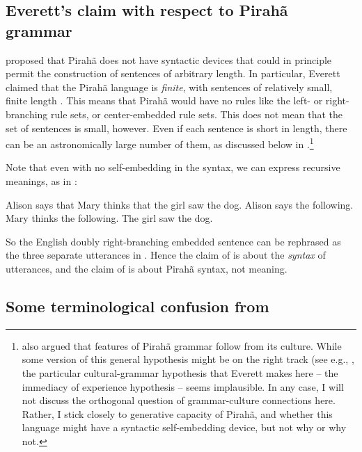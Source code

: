 \documentclass{article}
\begin{document}
\subsection{Everett's claim with respect to Pirahã grammar}

\citet{everett2005cultural} proposed that Pirahã does not have syntactic devices that could in principle permit the construction of sentences of arbitrary length. In particular, Everett claimed that the Pirahã language is \textit{finite}, with sentences of relatively small, finite length \citep{everett2012does}. This means that Pirahã would have no rules like the left- or right-branching rule sets, or center-embedded rule sets.  This does not mean that the set of sentences is small, however.  Even if each sentence is short in length, there can be an astronomically large number of them, as discussed below in .\footnote{\citet{everett2005cultural} also argued that features of Pirahã grammar follow from its culture.  While some version of this general hypothesis might be on the right track (see e.g., \citet{gil2021tense}, the particular cultural-grammar hypothesis that Everett makes here -- the immediacy of experience hypothesis -- seems implausible.  In any case, I will not discuss the orthogonal question of grammar-culture connections here.  Rather, I stick closely to generative capacity of Pirahã, and whether this language might have a syntactic  self-embedding device, but not why or why not.}

Note that even with no self-embedding in the syntax, we can express recursive meanings, as in :

\eal
\label{rec_meaning}
\ex \label{rec_meaning1} Alison says that Mary thinks that the girl saw the dog.
\ex \label{rec_meaning2} Alison says the following. Mary thinks the following. The girl saw the dog.
\zl

\noindent
So the English doubly right-branching embedded sentence  can be rephrased as the three separate utterances in . 
 Hence the claim of \citet{hauser2002faculty} is about the \textit{syntax} of utterances, and the claim of \citet{everett2005cultural} is about Pirahã syntax, not meaning.

\subsection{Some terminological confusion from \citet{nevins2009evidence}}
\end{document}
